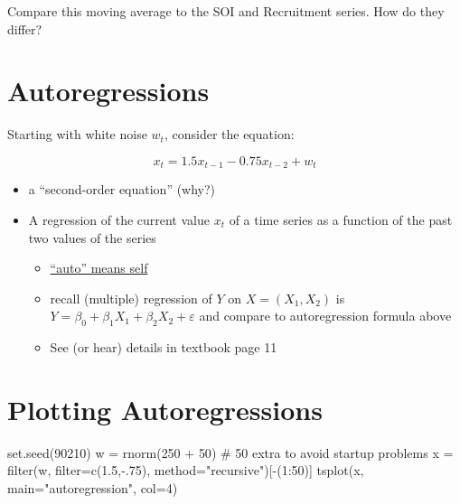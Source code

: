 \documentclass[
  letterpaper,
  DIV=11,
  numbers=noendperiod]{scrreprt}
\newenvironment{Shaded}{\begin{snugshade}}{\end{snugshade}}
\newcommand{\AttributeTok}[1]{\textcolor[rgb]{0.40,0.45,0.13}{#1}}
\newcommand{\CommentTok}[1]{\textcolor[rgb]{0.37,0.37,0.37}{#1}}
\newcommand{\DecValTok}[1]{\textcolor[rgb]{0.68,0.00,0.00}{#1}}
\newcommand{\FloatTok}[1]{\textcolor[rgb]{0.68,0.00,0.00}{#1}}
\newcommand{\FunctionTok}[1]{\textcolor[rgb]{0.28,0.35,0.67}{#1}}
\newcommand{\NormalTok}[1]{\textcolor[rgb]{0.00,0.23,0.31}{#1}}
\newcommand{\OtherTok}[1]{\textcolor[rgb]{0.00,0.23,0.31}{#1}}
\newcommand{\SpecialCharTok}[1]{\textcolor[rgb]{0.37,0.37,0.37}{#1}}
\newcommand{\StringTok}[1]{\textcolor[rgb]{0.13,0.47,0.30}{#1}}
\begin{document}
Compare this moving average to the SOI and Recruitment series. How do
they differ?

\section{Autoregressions}\label{autoregressions}

Starting with white noise \(w_t\), consider the equation:

\[
x_t = 1.5x_{t-1} - 0.75x_{t-2} + w_t
\]

\begin{itemize}
\item
  a ``second-order equation'' (why?)
\item
  A regression of the current value \(x_t\) of a time series as a
  function of the past two values of the series

  \begin{itemize}
  \item
    \href{https://www.merriam-webster.com/dictionary/auto}{``auto''
    means self}
  \item
    recall (multiple) regression of \(Y\) on \(X = (X_1, X_2)\) is
    \(Y = \beta_0 + \beta_1X_1 + \beta_2X_2 + \varepsilon\) and compare
    to autoregression formula above
  \item
    See (or hear) details in textbook page 11
  \end{itemize}
\end{itemize}

\section{Plotting Autoregressions}\label{plotting-autoregressions}

\begin{Shaded}
\begin{Highlighting}[]
\FunctionTok{set.seed}\NormalTok{(}\DecValTok{90210}\NormalTok{)}
\NormalTok{w }\OtherTok{=} \FunctionTok{rnorm}\NormalTok{(}\DecValTok{250} \SpecialCharTok{+} \DecValTok{50}\NormalTok{) }\CommentTok{\# 50 extra to avoid startup problems}
\NormalTok{x }\OtherTok{=} \FunctionTok{filter}\NormalTok{(w, }\AttributeTok{filter=}\FunctionTok{c}\NormalTok{(}\FloatTok{1.5}\NormalTok{,}\SpecialCharTok{{-}}\NormalTok{.}\DecValTok{75}\NormalTok{), }\AttributeTok{method=}\StringTok{"recursive"}\NormalTok{)[}\SpecialCharTok{{-}}\NormalTok{(}\DecValTok{1}\SpecialCharTok{:}\DecValTok{50}\NormalTok{)]}
\FunctionTok{tsplot}\NormalTok{(x, }\AttributeTok{main=}\StringTok{"autoregression"}\NormalTok{, }\AttributeTok{col=}\DecValTok{4}\NormalTok{)}
\end{Highlighting}
\end{Shaded}
\end{document}
